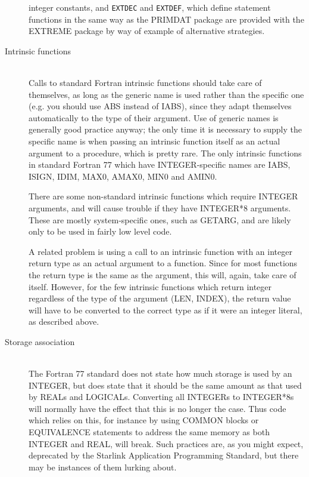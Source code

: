 \documentclass[twoside,11pt]{article}
\newcommand{\html}[1]{}
\newcommand{\xref}[3]{#1}
\renewcommand{\_}{\texttt{\symbol{95}}}
\newcommand{\file}[1]{{\tt #1}}
\newcommand{\ditem}[1]{\item[#1]\mbox{}\\}
\newenvironment{squote}{\begin{quote}\begin{small}}{\end{small}\end{quote}}
\begin{document}
\begin{description}
integer constants, and \file{EXT\_DEC} and \file{EXT\_DEF},
which define statement functions in the same way as the
\xref{PRIMDAT}{sun39}{} package are provided with the EXTREME 
package by way of example of alternative strategies.
\html{\begin{squote}\end{squote}}
%
\ditem{Intrinsic functions}
Calls to standard Fortran intrinsic functions should take care of themselves,
as long as the generic name is used rather than the specific one
(e.g. you should use ABS instead of IABS),
since they adapt themselves automatically to the type of their argument.  
Use of generic names is generally good practice anyway;
the only time it is necessary to supply the specific name is 
when passing an intrinsic function itself as an actual argument
to a procedure, which is pretty rare.
The only intrinsic functions in standard Fortran 77 which have 
INTEGER-specific names are IABS, ISIGN, IDIM, MAX0, AMAX0, MIN0 and AMIN0.

There are some non-standard intrinsic functions which require INTEGER
arguments, and will cause trouble if they have INTEGER*8 arguments.
These are mostly system-specific ones, such as GETARG,
and are likely only to be used in fairly low level code.

A related problem is using a call to an intrinsic function with 
an integer return type as an actual argument to a function.
Since for most functions the return type is the same as the argument,
this will, again, take care of itself.  However, for the few
intrinsic functions which return integer regardless of the type of
the argument (LEN, INDEX), the return value will have to be converted to
the correct type as if it were an integer literal, as described above.
\html{\begin{squote}\end{squote}}
%
\ditem{Storage association}
The Fortran 77 standard does not state how much storage is used by
an INTEGER, but does state that it should be the same amount as that
used by REALs and LOGICALs.
Converting all INTEGERs to INTEGER*8s will
normally have the effect that this is no longer the case.
Thus code which relies on this, for instance by using COMMON blocks or
EQUIVALENCE statements to address the same memory as both INTEGER and REAL,
will break.  
Such practices are, as you might expect, deprecated by the 
\xref{Starlink Application Programming Standard}{sgp16}{},
but there may be instances of them lurking about.


\end{description}
\end{document}
